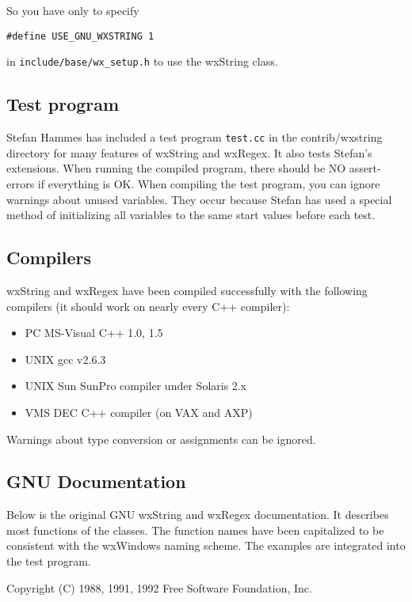 So you have only to specify

\begin{verbatim}
#define USE_GNU_WXSTRING 1
\end{verbatim}

in {\tt include/base/wx\_setup.h} to use the wxString class.

\subsection{Test program}

Stefan Hammes has included a test program {\tt test.cc} in the contrib/wxstring directory for many features
of wxString and wxRegex. It also tests Stefan's extensions.
When running the compiled program, there should
be NO assert-errors if everything is OK. When compiling the test
program, you can ignore warnings about unused variables. They
occur because Stefan has used a special method of initializing all
variables to the same start values before each test.

\subsection{Compilers}

wxString and wxRegex have been compiled successfully with the following
compilers (it should work on nearly every C++ compiler):

\begin{itemize}\itemsep=0pt
\item PC    MS-Visual C++ 1.0, 1.5
\item UNIX  gcc v2.6.3
\item UNIX  Sun SunPro compiler under Solaris 2.x
\item VMS   DEC C++ compiler (on VAX and AXP)
\end{itemize}

Warnings about type conversion or assignments can be ignored.

\subsection{GNU Documentation}

Below is the original GNU wxString and wxRegex
documentation. It describes most functions of the classes.
The function names have been capitalized to be consistent with
the wxWindows naming scheme. The examples are integrated into the test program.

Copyright (C) 1988, 1991, 1992 Free Software Foundation, Inc.

